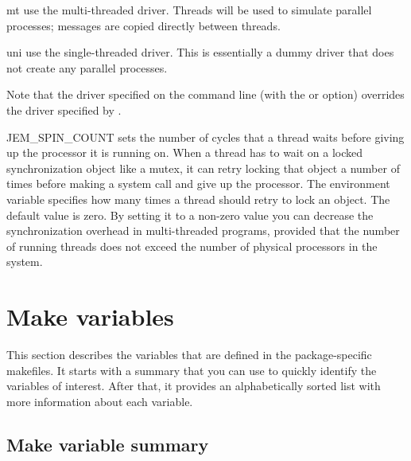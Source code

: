 \documentclass[a4paper,10pt]{article}
\begin{document}
\begin{Description}[\Code]
\begin{Description}[\Code]
  \item[mt]  use the multi-threaded driver. Threads will be used to
    simulate parallel processes; messages are copied directly between
    threads.

  \item[uni] use the single-threaded driver. This is essentially a dummy
    driver that does not create any parallel processes.

  \end{Description}
  Note that the driver specified on the command line (with the 
  or  option) overrides the driver specified by
  .

\item[JEM_SPIN_COUNT] sets the number of cycles that a thread waits
  before giving up the processor it is running on. When a thread has to
  wait on a locked synchronization object like a mutex, it can retry
  locking that object a number of times before making a system call and
  give up the processor. The environment variable 
  specifies how many times a thread should retry to lock an object. The
  default value is zero. By setting it to a non-zero value you can
  decrease the synchronization overhead in multi-threaded programs,
  provided that the number of running threads does not exceed the number
  of physical processors in the system.

\end{Description}


\section{Make variables
  \label{section:make-variables}}

This section describes the variables that are defined in the
package-specific makefiles. It starts with a summary that you can use to
quickly identify the variables of interest. After that, it provides an
alphabetically sorted list with more information about each variable.

\subsection{Make variable summary}
\end{document}
